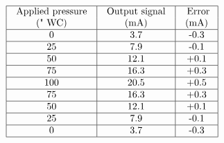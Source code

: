 
$$\vbox{\offinterlineskip
\halign{\strut
\vrule \quad\hfil # \ \hfil & 
\vrule \quad\hfil # \ \hfil & 
\vrule \quad\hfil # \ \hfil \vrule \cr
\noalign{\hrule}
%
Applied pressure & Output signal & Error\cr
%
(" WC) & (mA) & (mA) \cr
%
\noalign{\hrule}
%
0 & 3.7 & -0.3 \cr
%
\noalign{\hrule}
%
25 & 7.9 & -0.1 \cr
%
\noalign{\hrule}
%
50 & 12.1 & +0.1 \cr
%
\noalign{\hrule}
%
75 & 16.3 & +0.3 \cr
%
\noalign{\hrule}
%
100 & 20.5 & +0.5 \cr
%
\noalign{\hrule}
%
75 & 16.3 & +0.3 \cr
%
\noalign{\hrule}
%
50 & 12.1 & +0.1 \cr
%
\noalign{\hrule}
%
25 & 7.9 & -0.1 \cr
%
\noalign{\hrule}
%
0 & 3.7 & -0.3 \cr
%
\noalign{\hrule}
} %
}$$ %




